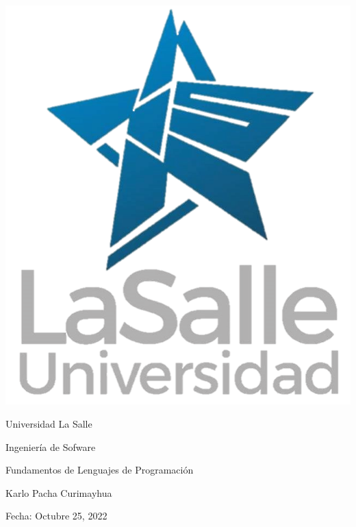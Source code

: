 \documentclass[12pt, a4paper]{exam}
\begin{document}
	\noindent
	\begin{minipage}[l]{0.1\textwidth}
		\noindent
		\includegraphics[width=2.4\textwidth]{logo.png}
	\end{minipage}
	\hfill

\begin{minipage}[c]{0.8\textwidth}
	\begin{center}
		{\large Universidad La Salle \par
		\small Ingeniería de Sofware	\par
		\large Fundamentos de Lenguajes de Programación	\par
\small Karlo Pacha Curimayhua \par
\small Fecha: Octubre 25, 2022} \par
	\end{center}
\end{minipage}
\par
\vspace{0.2in}
\noindent
\par 
\vspace{0.15in}
\noindent
{} \par
{}
\end{document}
